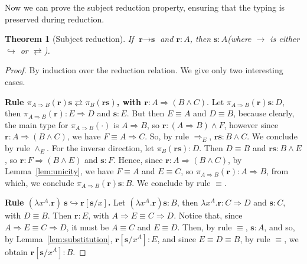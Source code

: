 \documentclass[final,copyright,creativecommons]{eptcs}
\newcommand{\eq}{\ensuremath{\rightleftarrows}}
\newcommand{\re}{\ensuremath{\hookrightarrow}}
\newcommand{\subst}[2]{\ensuremath{[{#1}/{#2}]}}
\newcommand{\ve}[1]{\ensuremath{\mathrm{\textbf{#1}}}}
\newtheorem{theorem}{Theorem}[section]
\theoremstyle{definition}
\begin{document}
\noindent Now we can prove the subject reduction property, ensuring that the typing is preserved during reduction.

\begin{theorem}[Subject reduction]\label{thm:SR}
 If $\ve r\to\ve s$ and $\ve r:A$, then $\ve s:A$\quad (where $\to$ is either $\re$ or $\eq$).
\end{theorem}
\begin{proof}
 By induction over the reduction relation. We give only two interesting cases.

\noindent\textbf{Rule  $\pi_{A\Rightarrow B}(\ve r)\ve s\eq\pi_B(\ve r\ve s)$, with $\ve r:A\Rightarrow(B\wedge C)$}. Let $\pi_{A\Rightarrow B}(\ve r)\ve s:D$, then $\pi_{A\Rightarrow B}(\ve r):E\Rightarrow D$ and $\ve s:E$. But then $E\equiv A$ and $D\equiv B$, because clearly, the main type for $\pi_{A\Rightarrow B}(\cdot)$ is $A\Rightarrow B$, so $\ve r:(A\Rightarrow B)\wedge F$, however since $\ve r:A\Rightarrow(B\wedge C)$, we have $F\equiv A\Rightarrow C$. So, by rule $\Rightarrow_E$, $\ve r\ve s:B\wedge C$. We conclude by rule $\wedge_E$.
For the inverse direction, let $\pi_B(\ve r\ve s):D$. Then $D\equiv B$ and $\ve r\ve s:B\wedge E$, so $\ve r:F\Rightarrow(B\wedge E)$ and $\ve s:F$. Hence, since $\ve r:A\Rightarrow(B\wedge C)$, by Lemma~\ref{lem:unicity}, we have $F\equiv A$ and $E\equiv C$, so $\pi_{A\Rightarrow B}(\ve r):A\Rightarrow B$, from which, we conclude $\pi_{A\Rightarrow B}(\ve r)\ve s:B$. We conclude by rule $\equiv$.

\noindent\textbf{Rule $(\lambda x^A.\ve r)~\ve s\re\ve r\subst{\ve s}{x}$.} Let $(\lambda x^A.\ve r)\ve s:B$, then $\lambda x^A.\ve r:C\Rightarrow D$ and $\ve s:C$, with $D\equiv B$. Then $\ve r:E$, with $A\Rightarrow E\equiv C\Rightarrow D$. Notice that, since $A\Rightarrow E\equiv C\Rightarrow D$, it must be $A\equiv C$ and $E\equiv D$. Then, by rule $\equiv$, $\ve s:A$, and so, by Lemma~\ref{lem:substitution}, $\ve r[\ve s/x^A]:E$, and since $E\equiv D\equiv B$, by rule $\equiv$, we obtain $\ve r[\ve s/x^A]:B$.
\qedhere
\end{proof}
\end{document}
